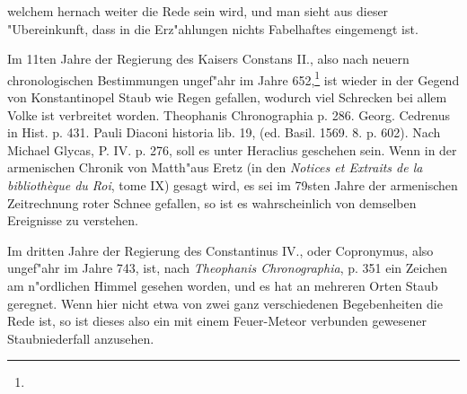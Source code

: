 \documentclass[a4paper, 11pt, oneside, polutonikogreek, german]{article}
\begin{document}
welchem hernach weiter die Rede sein wird, und man sieht aus dieser "Ubereinkunft, dass in die Erz"ahlungen nichts Fabelhaftes eingemengt ist.



Im 11ten Jahre der Regierung des Kaisers Constans II., also nach neuern chronologischen Bestimmungen ungef"ahr im Jahre 652,\footnote{} ist wieder in der Gegend von Konstantinopel Staub wie Regen gefallen, wodurch viel Schrecken bei allem Volke ist verbreitet worden. Theophanis Chronographia p. 286. Georg. Cedrenus in Hist. p. 431. Pauli Diaconi historia lib. 19, (ed. Basil. 1569. 8. p. 602). Nach Michael Glycas, P. IV. p. 276, soll es unter Heraclius geschehen sein. Wenn in der armenischen Chronik von Matth"aus Eretz (in den \emph{Notices et Extraits de la bibliothèque du Roi}, tome IX) gesagt wird, es sei im 79sten Jahre der armenischen Zeitrechnung roter Schnee gefallen, so ist es wahrscheinlich von demselben Ereignisse zu verstehen.

Im dritten Jahre der Regierung des Constantinus IV., oder Copronymus, also ungef"ahr im Jahre 743, ist, nach \emph{Theophanis Chronographia}, p. 351 ein Zeichen am n"ordlichen Himmel gesehen worden, und es hat an mehreren Orten Staub geregnet. Wenn hier nicht etwa von zwei ganz verschiedenen Begebenheiten die Rede ist, so ist dieses also ein mit einem Feuer-Meteor verbunden gewesener Staubniederfall anzusehen.
\end{document}
